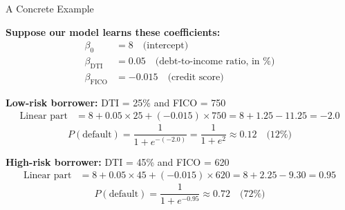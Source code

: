 \documentclass[10pt]{beamer}
\begin{document}
\begin{frame}{A Concrete Example}

  \textbf{Suppose our model learns these coefficients:}
  \begin{align*}
  \beta_0 &= 8 \quad \text{(intercept)} \\
  \beta_{\text{DTI}} &= 0.05 \quad \text{(debt-to-income ratio, in \%)} \\
  \beta_{\text{FICO}} &= -0.015 \quad \text{(credit score)}
  \end{align*}

  \vspace{0.5em}
  \textbf{Low-risk borrower:} DTI = 25\% and FICO = 750
  \begin{align*}
  \text{Linear part} &= 8 + 0.05 \times 25 + (-0.015) \times 750 = 8 + 1.25 - 11.25 = -2.0
  \end{align*}
  \[
  P(\text{default}) = \frac{1}{1 + e^{-(-2.0)}} = \frac{1}{1 + e^{2}} \approx \mathbf{0.12} \quad \text{(12\%)}
  \]

  \vspace{0.5em}
  \textbf{High-risk borrower:} DTI = 45\% and FICO = 620
  \begin{align*}
  \text{Linear part} &= 8 + 0.05 \times 45 + (-0.015) \times 620 = 8 + 2.25 - 9.30 = 0.95
  \end{align*}
  \[
  P(\text{default}) = \frac{1}{1 + e^{-0.95}} \approx \mathbf{0.72} \quad \text{(72\%)}
  \]
\end{frame}

\end{document}
